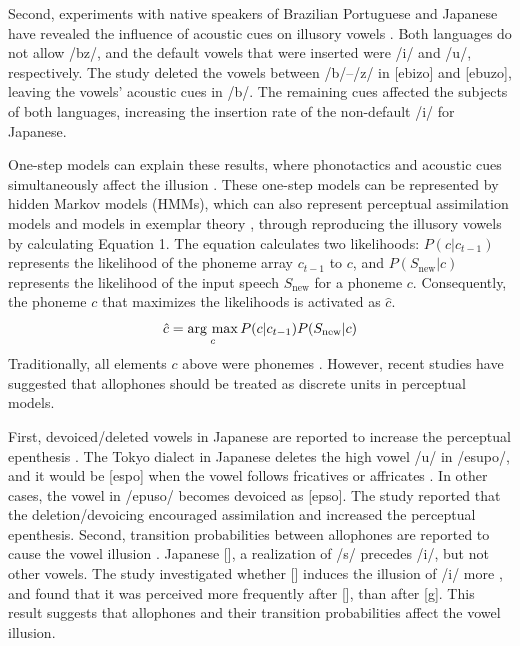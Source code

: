 \documentclass[a4paper,11pt,twocolumn]{article}
\newcommand{\argmax}{\mathop{\rm arg~max}\limits}
\begin{document}
Second, experiments with native speakers of Brazilian Portuguese and Japanese have revealed the influence of acoustic cues on illusory vowels \cite{dupoux2011illusory}. Both languages do not allow /bz/, and the default vowels that were inserted were /i/ and /u/, respectively. The study deleted the vowels between /b/--/z/ in [ebizo] and [ebuzo], leaving the vowels' acoustic cues in /b/. The remaining cues affected the subjects of both languages, increasing the insertion rate of the non-default /i/ for Japanese.

One-step models can explain these results, where phonotactics and acoustic cues simultaneously affect the illusion \cite{dupoux2011illusory}. These one-step models can be represented by hidden Markov models (HMMs), which can also represent perceptual assimilation models \cite{best2001discrimination} and models in exemplar theory \cite{lacerda1995perceptual}, through reproducing the illusory vowels \cite{kishiyama2021influence} by calculating Equation 1. The equation calculates two likelihoods: $P(c|c_{t-1})$ represents the likelihood of the phoneme array $c_{t-1}$ to $c$, and $P(S_{\text{new}}|c)$ represents the likelihood of the input speech $S_{\text{new}}$ for a phoneme $c$. Consequently, the phoneme $c$ that maximizes the likelihoods is activated as $\hat{c}$.
\begin{equation} \label{hmm}
    \hat{c} = \argmax_{c} P(c | c_{t-1})P(S_{\text{new}}|c)
\end{equation}
Traditionally, all elements $c$ above were phonemes \cite{wilson2013bayesian}. However, recent studies have suggested that allophones should be treated as discrete units in perceptual models.

First, devoiced/deleted vowels in Japanese are reported to increase the perceptual epenthesis \cite{kilpatrick2018japanese}. The Tokyo dialect in Japanese deletes the high vowel /u/ in /esupo/, and it would be [espo] when the vowel follows fricatives or affricates \cite{fujimoto2003devoice_eng, shaw2018lingual}. In other cases, the vowel in /epuso/ becomes devoiced as [ep\textsubring{\textturnm}so]. The study reported that the deletion/devoicing encouraged assimilation and increased the perceptual epenthesis. Second, transition probabilities between allophones are reported to cause the vowel illusion \cite{kilpatrick2020japanese}. Japanese [\textctc], a realization of /s/ precedes /i/, but not other vowels. The study investigated whether [\textctc{}] induces the illusion of /i/ more \cite{kilpatrick2020japanese}, and found that it was perceived more frequently after [\textctc], than after [g]. This result suggests that allophones and their transition probabilities affect the vowel illusion.
\end{document}

